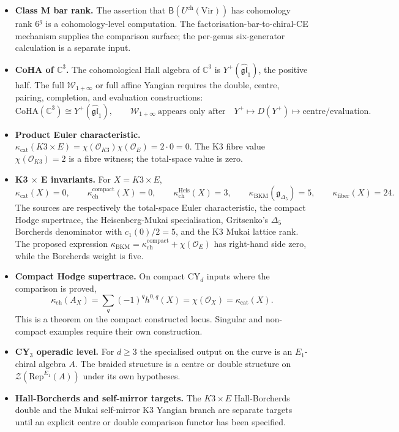 \documentclass[11pt]{amsart}
\providecommand{\C}{\mathbb{C}}
\providecommand{\cO}{\mathcal{O}}
\providecommand{\Uch}{U^{\mathrm{ch}}}
\providecommand{\barB}{\mathsf{B}}
\providecommand{\kch}{\kappa_{\mathrm{ch}}}
\providecommand{\kcat}{\kappa_{\mathrm{cat}}}
\providecommand{\kBKM}{\kappa_{\mathrm{BKM}}}
\providecommand{\kfib}{\kappa_{\mathrm{fiber}}}
\providecommand{\CoHA}{\mathrm{CoHA}}
\providecommand{\Woneinf}{\mathcal{W}_{1+\infty}}
\theoremstyle{plain}
\theoremstyle{definition}
\theoremstyle{remark}
\begin{document}
\begin{itemize}
\item \textbf{Class M bar rank.} The assertion that
$\barB(\Uch(\mathrm{Vir}))$ has cohomology rank $6^g$ is a
cohomology-level computation.  The factorisation-bar-to-chiral-CE
mechanism supplies the comparison surface; the per-genus six-generator
calculation is a separate input.

\item \textbf{CoHA of $\C^3$.} The cohomological Hall algebra of
$\C^3$ is $Y^+(\widehat{\mathfrak{gl}}_1)$, the positive half.  The full
\(\Woneinf\) or full affine Yangian requires the double, centre,
pairing, completion, and evaluation constructions:
\[
  \CoHA(\C^3)\cong Y^+(\widehat{\mathfrak{gl}}_1),
  \qquad
  \Woneinf\ \text{appears only after}\quad
  Y^+\mapsto D(Y^+)\mapsto\text{centre/evaluation}.
\]

\item \textbf{Product Euler characteristic.}
$\kcat(K3\times E)=\chi(\cO_{K3})\chi(\cO_E)=2\cdot 0=0$.  The K3 fibre
value $\chi(\cO_{K3})=2$ is a fibre witness; the total-space value is
zero.

\item \textbf{K3 \(\times\) E invariants.} For \(X=K3\times E\),
\[
  \kcat(X)=0,\qquad
  \kch^{\mathrm{compact}}(X)=0,\qquad
  \kch^{\mathrm{Heis}}(X)=3,\qquad
  \kBKM(\mathfrak g_{\Delta_5})=5,\qquad
  \kfib(X)=24.
\]
The sources are respectively the total-space Euler characteristic, the
compact Hodge supertrace, the Heisenberg-Mukai specialisation,
Gritsenko's \(\Delta_5\) Borcherds denominator with \(c_1(0)/2=5\), and
the K3 Mukai lattice rank.  The proposed expression
\(\kBKM=\kch^{\mathrm{compact}}+\chi(\cO_E)\) has right-hand side
zero, while the Borcherds weight is five.

\item \textbf{Compact Hodge supertrace.} On compact CY$_d$ inputs where
the comparison is proved,
\[
  \kch(A_X)=\sum_q(-1)^q h^{0,q}(X)=\chi(\cO_X)=\kcat(X).
\]
This is a theorem on the compact constructed locus.  Singular and
non-compact examples require their own construction.

\item \textbf{CY$_3$ operadic level.} For $d\geq 3$ the specialised
output on the curve is an \(E_1\)-chiral algebra \(A\).  The braided
structure is a centre or double structure on
\(\mathcal Z(\mathrm{Rep}^{E_1}(A))\) under its own hypotheses.

\item \textbf{Hall-Borcherds and self-mirror targets.} The
\(K3\times E\) Hall-Borcherds double and the Mukai self-mirror K3
Yangian branch are separate targets until an explicit centre or double
comparison functor has been specified.
\end{itemize}
\end{document}
